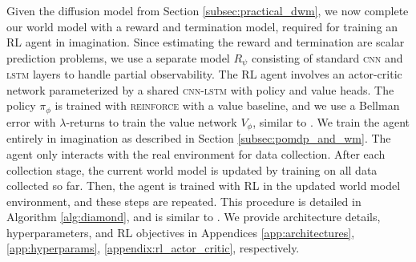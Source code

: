 Given the diffusion model from Section \ref{subsec:practical_dwm}, we now complete our world model with a reward and termination model, required for training an RL agent in imagination. Since estimating the reward and termination are scalar prediction problems, we use a separate model $R_\psi$ consisting of standard \textsc{cnn} \citep{cnn_lecun,He2015} and \textsc{lstm} \citep{lstm,Gers2000} layers to handle partial observability. The RL agent involves an actor-critic network parameterized by a shared \textsc{cnn-lstm} with policy and value heads. The policy $\pi_\phi$ is trained with \textsc{reinforce} with a value baseline, and we use a Bellman error with $\lambda$-returns to train the value network $V_\phi$, similar to \citet{iris2023}. We train the agent entirely in imagination as described in Section \ref{subsec:pomdp_and_wm}. The agent only interacts with the real environment for data collection. After each collection stage, the current world model is updated by training on all data collected so far. Then, the agent is trained with RL in the updated world model environment, and these steps are repeated. This procedure is detailed in Algorithm \ref{alg:diamond}, and is similar to \citet{kaiser2019atari100k,hafner2020dream,iris2023}. We provide architecture details, hyperparameters, and RL objectives in Appendices \ref{app:architectures}, \ref{app:hyperparams}, \ref{appendix:rl_actor_critic}, respectively.
